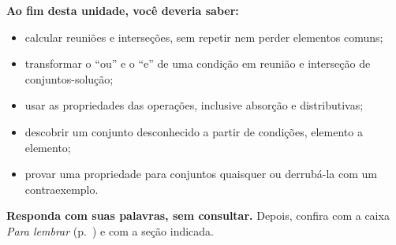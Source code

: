 \begin{sintese}
\textbf{Ao fim desta unidade, você deveria saber:}
\begin{itemize}[leftmargin=1.4em,itemsep=1pt]
  \item calcular reuniões e interseções, sem repetir nem perder elementos comuns;
  \item transformar o \enquote{ou} e o \enquote{e} de uma condição em reunião e interseção de conjuntos-solução;
  \item usar as propriedades das operações, inclusive absorção e distributivas;
  \item descobrir um conjunto desconhecido a partir de condições, elemento a elemento;
  \item provar uma propriedade para conjuntos quaisquer ou derrubá-la com um contraexemplo.
\end{itemize}
\smallskip\noindent\textbf{Responda com suas palavras, sem consultar.} Depois, confira com a caixa \emph{Para lembrar} (p.~\pageref{lembrar-u3}) e com a seção indicada.
\begin{enumerate}[label=\arabic*.,leftmargin=1.4em]
\end{enumerate}
\end{sintese}

\Respostas
{\small{}}
